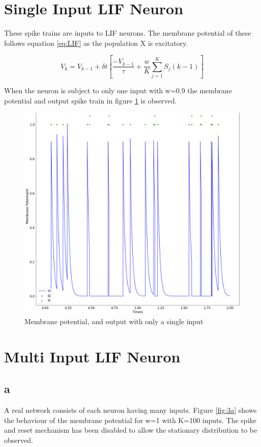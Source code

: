 \documentclass[twoside,twocolumn]{article}
\begin{document}
\section{Single Input LIF Neuron}
These spike trains are inputs to LIF neurons. The membrane potential of these follows equation \ref{eq:LIF} as the population X is excitatory. 

\begin{equation}
V_k = V_{k-1} + \delta t [ \frac{-V_{k-1}}{\tau} + \frac{w}{K} \sum ^K_{j=1} S_j(k-1)]
\label{eq:LIF}
\end{equation}

When the neuron is subject to only one input with w=0.9 the membrane potential and output spike train in figure \ref{fig:2} is observed.

\begin{figure}[h]
  \centering
    \includegraphics[width=\linewidth]{2}
  \caption{Membrane potential, and output with only a single input}
  \label{fig:2}
\end{figure}
\section{Multi Input LIF Neuron}
\subsection{a}
A real network consists of each neuron having many inputs. Figure \ref{fig:3a} shows the behaviour of the membrane potential for w=1 with K=100 inputs. The spike and reset mechanism has been disabled to allow the stationary distribution to be observed.
\end{document}
